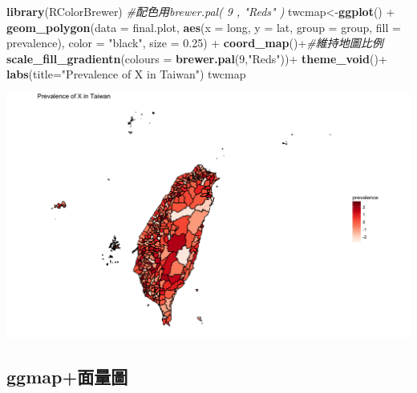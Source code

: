 \documentclass[]{book}
\newenvironment{Shaded}{\begin{snugshade}}{\end{snugshade}}
\newcommand{\KeywordTok}[1]{\textcolor[rgb]{0.13,0.29,0.53}{\textbf{{#1}}}}
\newcommand{\DataTypeTok}[1]{\textcolor[rgb]{0.13,0.29,0.53}{{#1}}}
\newcommand{\DecValTok}[1]{\textcolor[rgb]{0.00,0.00,0.81}{{#1}}}
\newcommand{\FloatTok}[1]{\textcolor[rgb]{0.00,0.00,0.81}{{#1}}}
\newcommand{\StringTok}[1]{\textcolor[rgb]{0.31,0.60,0.02}{{#1}}}
\newcommand{\CommentTok}[1]{\textcolor[rgb]{0.56,0.35,0.01}{\textit{{#1}}}}
\newcommand{\NormalTok}[1]{{#1}}
\theoremstyle{definition}
\theoremstyle{definition}
\theoremstyle{remark}
\begin{document}
\begin{Shaded}
\begin{Highlighting}[]
\KeywordTok{library}\NormalTok{(RColorBrewer) }\CommentTok{#配色用brewer.pal( 9 , "Reds" )}
\NormalTok{twcmap<-}\KeywordTok{ggplot}\NormalTok{() +}
\StringTok{    }\KeywordTok{geom_polygon}\NormalTok{(}\DataTypeTok{data =} \NormalTok{final.plot, }
                 \KeywordTok{aes}\NormalTok{(}\DataTypeTok{x =} \NormalTok{long, }\DataTypeTok{y =} \NormalTok{lat, }\DataTypeTok{group =} \NormalTok{group, }
                     \DataTypeTok{fill =} \NormalTok{prevalence), }
                 \DataTypeTok{color =} \StringTok{"black"}\NormalTok{, }\DataTypeTok{size =} \FloatTok{0.25}\NormalTok{) +}\StringTok{ }
\StringTok{    }\KeywordTok{coord_map}\NormalTok{()+}\CommentTok{#維持地圖比例}
\StringTok{    }\KeywordTok{scale_fill_gradientn}\NormalTok{(}\DataTypeTok{colours =} \KeywordTok{brewer.pal}\NormalTok{(}\DecValTok{9}\NormalTok{,}\StringTok{"Reds"}\NormalTok{))+}
\StringTok{    }\KeywordTok{theme_void}\NormalTok{()+}
\StringTok{    }\KeywordTok{labs}\NormalTok{(}\DataTypeTok{title=}\StringTok{"Prevalence of X in Taiwan"}\NormalTok{)}
\NormalTok{twcmap}
\end{Highlighting}
\end{Shaded}

\includegraphics[width=15.71in]{figure/Taiwan}

\subsection{ggmap+面量圖}\label{ggmap}
\end{document}
